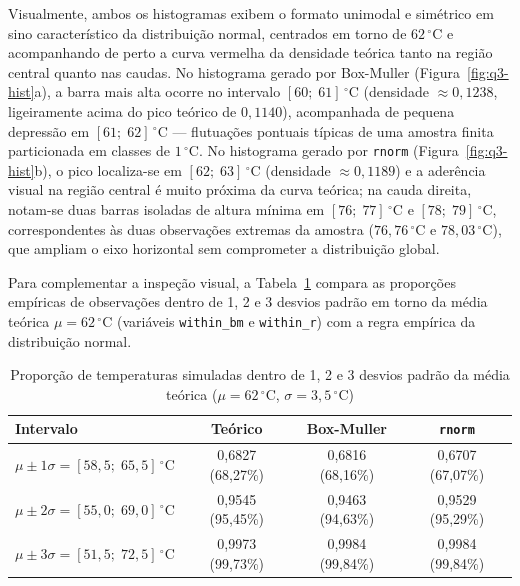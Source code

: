 \documentclass[10pt,a4paper]{article}
\begin{document}
Visualmente, ambos os histogramas exibem o formato unimodal e simétrico em sino característico da distribuição normal, centrados em torno de $62\,^\circ\text{C}$ e acompanhando de perto a curva vermelha da densidade teórica tanto na região central quanto nas caudas. No histograma gerado por Box-Muller (Figura~\ref{fig:q3-hist}a), a barra mais alta ocorre no intervalo $[60;\; 61]\,^\circ\text{C}$ (densidade $\approx 0{,}1238$, ligeiramente acima do pico teórico de $0{,}1140$), acompanhada de pequena depressão em $[61;\; 62]\,^\circ\text{C}$ — flutuações pontuais típicas de uma amostra finita particionada em classes de $1\,^\circ\text{C}$. No histograma gerado por \texttt{rnorm} (Figura~\ref{fig:q3-hist}b), o pico localiza-se em $[62;\; 63]\,^\circ\text{C}$ (densidade $\approx 0{,}1189$) e a aderência visual na região central é muito próxima da curva teórica; na cauda direita, notam-se duas barras isoladas de altura mínima em $[76;\; 77]\,^\circ\text{C}$ e $[78;\; 79]\,^\circ\text{C}$, correspondentes às duas observações extremas da amostra ($76{,}76\,^\circ\text{C}$ e $78{,}03\,^\circ\text{C}$), que ampliam o eixo horizontal sem comprometer a distribuição global.

Para complementar a inspeção visual, a Tabela~\ref{tab:q3-regra} compara as proporções empíricas de observações dentro de 1, 2 e 3 desvios padrão em torno da média teórica $\mu = 62\,^\circ\text{C}$ (variáveis \texttt{within\_bm} e \texttt{within\_r}) com a regra empírica da distribuição normal.

\begin{table}[H]
\centering
\caption{Proporção de temperaturas simuladas dentro de 1, 2 e 3 desvios padrão da média teórica ($\mu = 62\,^\circ\text{C}$, $\sigma = 3{,}5\,^\circ\text{C}$)}
\label{tab:q3-regra}
\begin{tabular}{lccc}
\hline
\textbf{Intervalo} & \textbf{Teórico} & \textbf{Box-Muller} & \textbf{\texttt{rnorm}} \\
\hline
$\mu \pm 1\sigma = [58{,}5;\; 65{,}5]\,^\circ\text{C}$ & 0,6827 (68,27\%) & 0,6816 (68,16\%) & 0,6707 (67,07\%) \\
$\mu \pm 2\sigma = [55{,}0;\; 69{,}0]\,^\circ\text{C}$ & 0,9545 (95,45\%) & 0,9463 (94,63\%) & 0,9529 (95,29\%) \\
$\mu \pm 3\sigma = [51{,}5;\; 72{,}5]\,^\circ\text{C}$ & 0,9973 (99,73\%) & 0,9984 (99,84\%) & 0,9984 (99,84\%) \\
\hline
\end{tabular}
\end{table}
\end{document}
